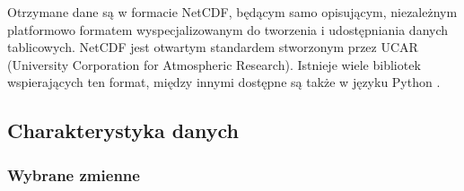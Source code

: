 Otrzymane dane są w formacie NetCDF, będącym samo opisującym, niezależnym platformowo formatem
wyspecjalizowanym do tworzenia i udostępniania danych tablicowych. NetCDF jest otwartym standardem
stworzonym przez UCAR (University Corporation for Atmospheric Research). Istnieje wiele bibliotek
wspierających ten format, między innymi dostępne są także w języku Python \cite{python}.

\subsection{Charakterystyka danych}

\subsubsection{Wybrane zmienne}

